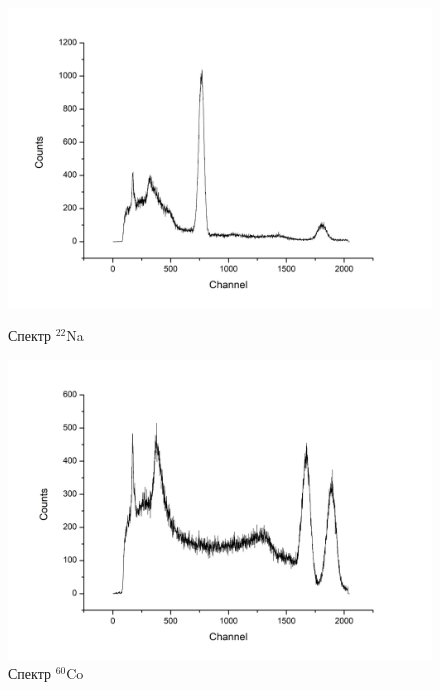 \documentclass[a4paper]{article}
\begin{document}
\begin{enumerate}
        \begin{figure}[h]
\begin{center}
\begin{minipage}[h]{0.48\linewidth}
\includegraphics[width=1\linewidth]{Na.png}
\caption{Спектр $^{22}$Na} %
\end{minipage}
\hfill 
\begin{minipage}[h]{0.48\linewidth}
\includegraphics[width=1\linewidth]{Co.png}
\caption{Спектр $^{60}$Co}
\label{ris:experimcoded}
\end{minipage}
\end{center}
\end{figure}


\end{enumerate}
\end{document}
